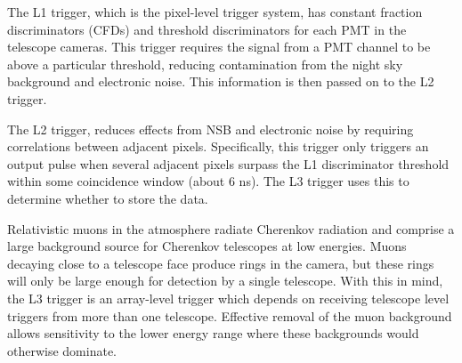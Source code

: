 \documentclass[main.tex]{subfiles}
\begin{document}
The L1 trigger, which is the pixel-level trigger system, has constant fraction discriminators (CFDs) and threshold discriminators for each PMT in the telescope cameras. This trigger requires the signal from a PMT channel to be above a particular threshold, reducing contamination from the night sky background and electronic noise. This information is then passed on to the L2 trigger.

The L2 trigger, reduces effects from NSB and electronic noise by requiring correlations between adjacent pixels. Specifically, this trigger only triggers an output pulse when several adjacent pixels surpass the L1 discriminator threshold within some coincidence window (about 6 ns). The L3 trigger uses this to determine whether to store the data.

Relativistic muons in the atmosphere radiate Cherenkov radiation and comprise a large background source for Cherenkov telescopes at low energies. Muons decaying close to a telescope face produce rings in the camera, but these rings will only be large enough for detection by a single telescope. With this in mind, the L3 trigger is an array-level trigger which depends on receiving telescope level triggers from more than one telescope. Effective removal of the muon background allows sensitivity to the lower energy range where these backgrounds would otherwise dominate.
\end{document}
